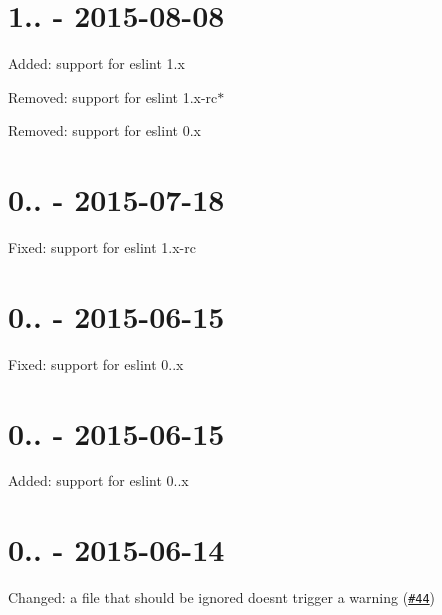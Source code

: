 \section*{1.. -\/ 2015-\/08-\/08}


\begin{DoxyItemize}
\item Added\+: support for eslint 1.\+x
\item Removed\+: support for eslint 1.\+x-\/rc$\ast$
\item Removed\+: support for eslint 0.\+x
\end{DoxyItemize}

\section*{0.. -\/ 2015-\/07-\/18}


\begin{DoxyItemize}
\item Fixed\+: support for eslint 1.\+x-\/rc
\end{DoxyItemize}

\section*{0.. -\/ 2015-\/06-\/15}


\begin{DoxyItemize}
\item Fixed\+: support for eslint 0..\+x
\end{DoxyItemize}

\section*{0.. -\/ 2015-\/06-\/15}


\begin{DoxyItemize}
\item Added\+: support for eslint 0..\+x
\end{DoxyItemize}

\section*{0.. -\/ 2015-\/06-\/14}


\begin{DoxyItemize}
\item Changed\+: a file that should be ignored doesn\textquotesingle{}t trigger a warning (\href{https://github.com/MoOx/eslint-loader/issues/44}{\tt \#44})
\end{DoxyItemize}

